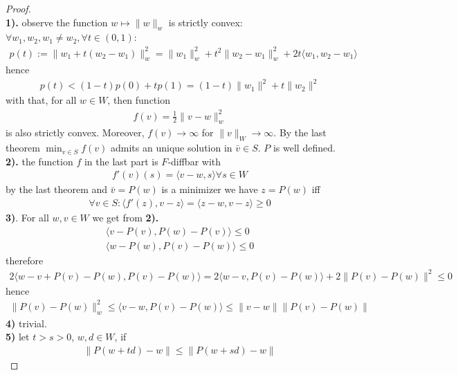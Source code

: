 \begin{proof}
	\qquad\\
	\textbf{1).} observe the function $w \mapsto \|w\|_w$ is strictly convex: $\forall w_1, w_2, w_1 \neq w_2, \forall t \in (0, 1):$
	\begin{align*}
		p(t):= \|w_1 + t(w_2 - w_1)\|_w^2 = \|w_1\|_w^2 + t^2\|w_2 - w_1\|^2_w+ 2t\langle w_1, w_2 - w_1\rangle
	\end{align*}
	hence
	\begin{align*}
		p(t) < (1 - t) p(0) +  t p(1) = (1 - t) \|w_1\|^2 + t \|w_2\|^2
	\end{align*}
	with that, for all $w \in W$, then function
	\begin{align*}
		f(v) = \frac{1}{2}\|v - w\|_w^2
	\end{align*}
	is also strictly convex. Moreover, $f(v) \rightarrow \infty$ for $\|v\|_W \rightarrow \infty$. By the last theorem $\min_{v \in S} f(v)$ admits an unique solution in $\bar{v} \in S$. $P$ is well defined. \\
	\textbf{2).} the function $f$ in the last part is $F$-diffbar with
	\begin{align*}
		f'(v)(s) = \langle v - w, s \rangle \forall s \in W
	\end{align*}
	by the last theorem and $\bar{v} = P(w)$ is a minimizer we have $z = P(w)$ iff
	\begin{align*}
		\forall v \in S:
		\langle f'(z), v - z \rangle = \langle z - w, v - z \rangle \geq 0
	\end{align*}
	\textbf{3)}. For all $w, v \in W$ we get from \textbf{2).}
	\begin{align*}
		\langle v - P(v), P(w) - P(v) \rangle \le 0\\
		\langle w - P(w), P(v) - P(w) \rangle \le 0
	\end{align*}
	therefore
	\begin{align*}
		2 \langle w - v + P(v) - P(w), P(v) - P(w) \rangle
		= 2 \langle w - v, P(v) - P(w) \rangle + 2\|P(v) - P(w)\|^2  \le 0
	\end{align*}
	hence 
	\begin{align*}
		\|P(v) - P(w) \|_w^2 \le \langle v - w, P(v) - P(w) \rangle
		\le \|v - w\| \|P(v) - P(w)\|
	\end{align*}
	\textbf{4)} trivial.\\
	\textbf{5)} let $ t > s > 0$, $w , d \in W$, if 
	\begin{align*}
		\|P(w + td) - w\| \le \|P(w + sd) - w\|
	\end{align*}

\end{proof}
